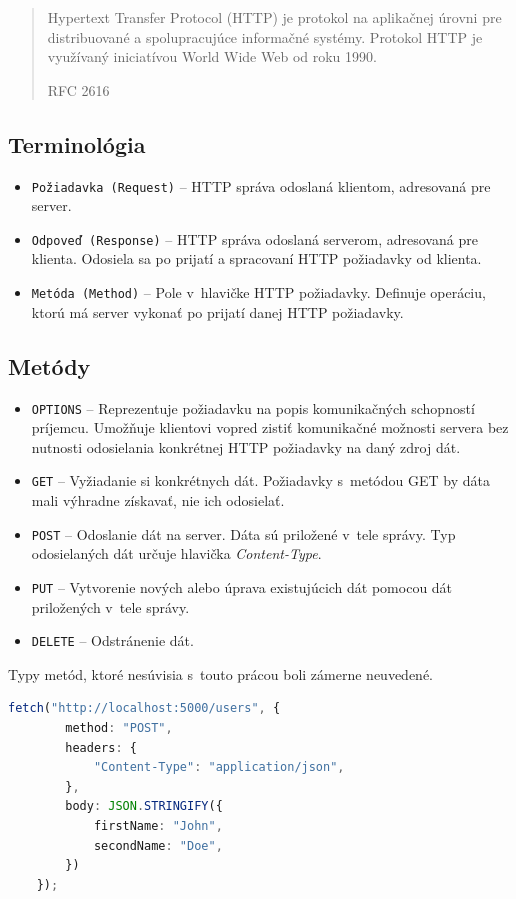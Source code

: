\blockquote[RFC 2616 \cite{RFC_HTTP}]{Hypertext Transfer Protocol (HTTP) je protokol na aplikačnej úrovni pre distribuované a spolupracujúce informačné systémy. Protokol HTTP je využívaný iniciatívou World Wide Web od roku 1990.}
 
\subsection{Terminológia}

\begin{itemize}
	\item \texttt{Požiadavka (Request)} -- HTTP správa odoslaná klientom, adresovaná pre server.
	\item \texttt{Odpoveď (Response)} -- HTTP správa odoslaná serverom, adresovaná pre klienta. Odosiela sa po prijatí a spracovaní HTTP požiadavky od klienta.
	\item \texttt{Metóda (Method)} -- Pole v~hlavičke HTTP požiadavky. Definuje operáciu, ktorú má server vykonať po prijatí danej HTTP požiadavky.
\end{itemize}

\subsection{Metódy}
\begin{itemize}
	\item \texttt{OPTIONS} -- Reprezentuje požiadavku na popis komunikačných schopností príjemcu. Umožňuje klientovi vopred zistiť komunikačné možnosti servera bez nutnosti odosielania konkrétnej HTTP požiadavky na daný zdroj dát. \cite{MDN}
	\item \texttt{GET} -- Vyžiadanie si konkrétnych dát. Požiadavky s~metódou GET by dáta mali výhradne získavať, nie ich odosielať. \cite{MDN}
	\item \texttt{POST} -- Odoslanie dát na server. Dáta sú priložené v~tele správy. Typ odosielaných dát určuje hlavička \emph{Content-Type}. \cite{MDN}
	\item \texttt{PUT} -- Vytvorenie nových alebo úprava existujúcich dát pomocou dát priložených v~tele správy. \cite{MDN}
	\item \texttt{DELETE} -- Odstránenie dát. \cite{MDN}
\end{itemize}

\noindent Typy metód, ktoré nesúvisia s~touto prácou boli zámerne neuvedené. \\

\begin{lstlisting}[language=TypeScript, caption=Príklad odoslania HTTP POST metódy v~prostredí TypeScript.]
	fetch("http://localhost:5000/users", {
		method: "POST",
		headers: {
			"Content-Type": "application/json",
		},
		body: JSON.STRINGIFY({
			firstName: "John",
			secondName: "Doe",
		})
	});
\end{lstlisting}

